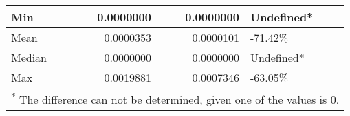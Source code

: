 \begin{table}
\begin{tabular}[t]{l|r|r|l}
\hline
\hspace{1em}Min & 0.0000000 & 0.0000000 & Undefined*\\
\hline
\hspace{1em}Mean & 0.0000353 & 0.0000101 & -71.42\%\\
\hline
\hspace{1em}Median & 0.0000000 & 0.0000000 & Undefined*\\
\hline
\hspace{1em}Max & 0.0019881 & 0.0007346 & -63.05\%\\
\hline
\multicolumn{4}{l}{\rule{0pt}{1em}\textsuperscript{*} The difference can not be determined, given one of the values is 0.}\\
\end{tabular}
\end{table}

